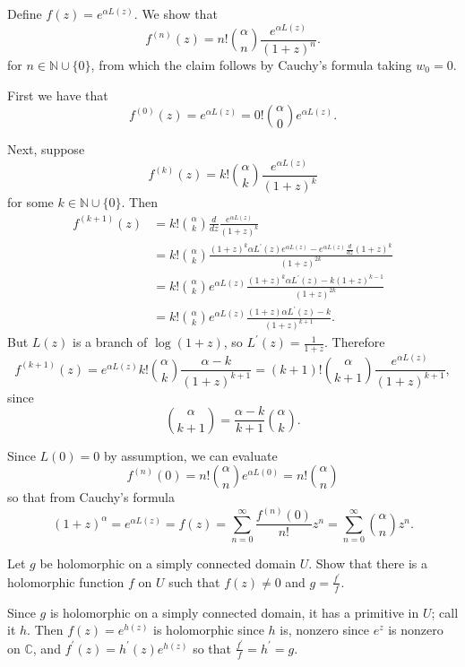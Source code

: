 \documentclass{article}
\newcounter{Problem}
\newenvironment{Problem}{\begin{Exercise}[name={Problem},
                                          counter={Problem}]}
                        {\end{Exercise}}
\begin{document}
\begin{Answer}
Define $f(z) = e^{\alpha L(z)}$. We show that
$$
f^{(n)}(z) = n! {\alpha \choose n} \frac{e^{\alpha L(z)}}{(1 + z)^n}.
$$
for $n \in \mathbb{N} \cup \{0\}$, from which the claim follows by
Cauchy's formula taking $w_0 = 0$.

First we have that
$$
  f^{(0)}(z)
= e^{\alpha L(z)}
= 0! {\alpha \choose 0} e^{\alpha L(z)}.
$$

Next, suppose
$$
f^{(k)}(z) = k! {\alpha \choose k} \frac{e^{\alpha L(z)}}{(1 + z)^k}
$$
for some $k \in \mathbb{N} \cup \{ 0 \}$. Then
\begin{align*}
   f^{(k+1)}(z)
&= k! {\alpha \choose k}
   \frac{d}{dz}
   \frac{e^{\alpha L(z)}}{(1 + z)^k} \\
&= k! {\alpha \choose k}
   \frac{ (1 + z)^k \alpha L^\prime(z) e^{\alpha L(z)}
        - e^{\alpha L(z)} \frac{d}{dz} (1 + z)^k
   }
   {(1 + z)^{2k}} \\
&= k! {\alpha \choose k}
   e^{\alpha L(z)}
   \frac{(1 + z)^k \alpha L^{\prime}(z) - k (1 + z)^{k-1}}
        {(1 + z)^{2k}} \\
&= k! {\alpha \choose k}
   e^{\alpha L(z)}
   \frac{(1 + z) \alpha L^\prime(z) - k}{(1 + z)^{k + 1}}.
\end{align*}
But $L(z)$ is a branch of $\log (1 + z)$, so $L^\prime(z) = \frac{1}{1 + z}$.
Therefore
$$
  f^{(k+1)}(z)
= e^{\alpha L(z)} k!
  {\alpha \choose k}
  \frac{\alpha - k}{(1 + z)^{k+1}}
= (k + 1)! {\alpha \choose k + 1} \frac{e^{\alpha L(z)}}{(1 + z)^{k+1}},
$$
since
$$
  {\alpha \choose k + 1}
= \frac{\alpha - k}{k+1} {\alpha \choose k}.
$$

Since $L(0) = 0$ by assumption, we can evaluate
$$
  f^{(n)}(0)
= n! {\alpha \choose n} e^{\alpha L(0)}
= n! {\alpha \choose n}
$$
so that from Cauchy's formula
$$
  (1 + z)^\alpha
= e^{\alpha L(z)}
= f(z)
= \sum_{n=0}^\infty \frac{f^{(n)}(0)}{n!} z^n
= \sum_{n=0}^\infty {\alpha \choose n} z^n.
$$

\end{Answer}

\begin{Problem}
Let $g$ be holomorphic on a simply connected domain $U$. Show that there is a
holomorphic function $f$ on $U$ such that $f(z) \neq 0$ and
$g = \frac{f^\prime}{f}$.
\end{Problem}

\begin{Answer}
Since $g$ is holomorphic on a simply connected domain, it has a primitive in
$U$; call it $h$. Then $f(z) = e^{h(z)}$ is holomorphic since $h$ is,
nonzero since $e^z$ is nonzero on $\mathbb{C}$, and
$f^\prime(z) = h^\prime(z) e^{h(z)}$ so that $\frac{f^\prime}{f} = h^\prime = g$.
\end{Answer}
\end{document}
